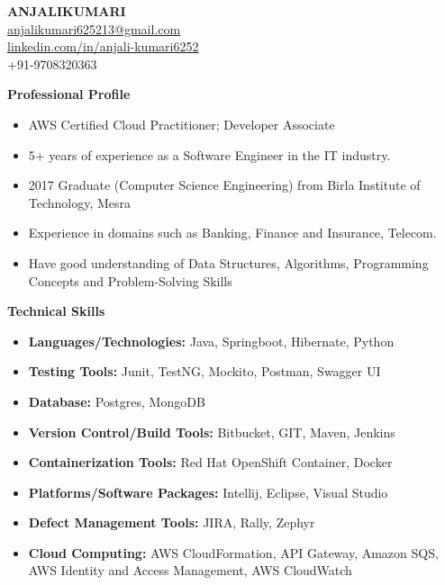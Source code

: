 \documentclass[a4paper,10pt]{article}
\begin{document}
\begin{center}
    {\Large \textbf{ANJALIKUMARI}} \\
    \href{mailto:anjalikumari625213@gmail.com}{anjalikumari625213@gmail.com} \\
    \href{https://linkedin.com/in/anjali-kumari6252}{linkedin.com/in/anjali-kumari6252} \\
    +91-9708320363
\end{center}

\vspace{0.5cm}

\textbf{Professional Profile}

\begin{itemize}
    \item AWS Certified Cloud Practitioner; Developer Associate
    \item 5+ years of experience as a Software Engineer in the IT industry.
    \item 2017 Graduate (Computer Science Engineering) from Birla Institute of Technology, Mesra
    \item Experience in domains such as Banking, Finance and Insurance, Telecom.
    \item Have good understanding of Data Structures, Algorithms, Programming Concepts and Problem-Solving Skills
\end{itemize}

\vspace{0.5cm}

\textbf{Technical Skills}

\begin{itemize}
    \item \textbf{Languages/Technologies:} Java, Springboot, Hibernate, Python
    \item \textbf{Testing Tools:} Junit, TestNG, Mockito, Postman, Swagger UI
    \item \textbf{Database:} Postgres, MongoDB
    \item \textbf{Version Control/Build Tools:} Bitbucket, GIT, Maven, Jenkins
    \item \textbf{Containerization Tools:} Red Hat OpenShift Container, Docker
    \item \textbf{Platforms/Software Packages:} Intellij, Eclipse, Visual Studio
    \item \textbf{Defect Management Tools:} JIRA, Rally, Zephyr
    \item \textbf{Cloud Computing:} AWS CloudFormation, API Gateway, Amazon SQS, AWS Identity and Access Management, AWS CloudWatch
\end{itemize}
\end{document}
